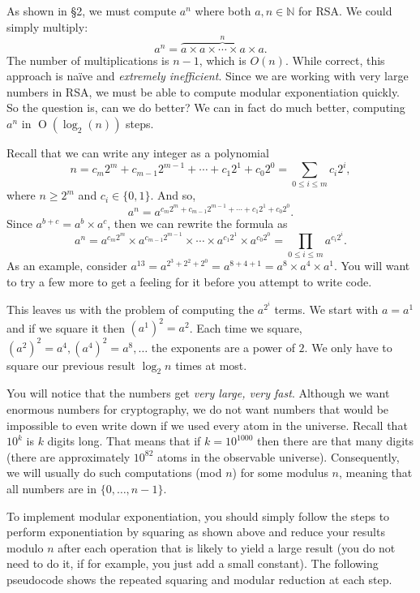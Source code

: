 As shown in \S2, we must compute $a^n$ where both $a, n \in \mathbb{N}$
for RSA. We could simply multiply:
\[
  a^n = \overbrace{a \times a \times \cdots \times a \times a}^n .
\]
The number of multiplications is $n-1$,
which is ${O}(n)$. While correct, this approach is na{\"{i}}ve and
\emph{extremely inefficient}. Since we are working with very large
numbers in RSA, we must be able to compute modular exponentiation
quickly. So the question is, can we do better? We can in fact do much
better, computing $a^n$ in $\operatorname{O}(\log_2(n))$ steps.

Recall that we can write any integer as a polynomial
\[
  n = c_m 2^m + c_{m-1} 2^{m-1} + \cdots + c_1 2^1 + c_0 2^0 =
  \sum_{0\le i \le m} c_i 2^i ,
\]
where $n \ge 2^m$ and $c_i \in \{0, 1\}$. And so,
\[
  a^n = a^{c_m 2^m + c_{m-1} 2^{m-1} + \cdots + c_1 2^1 + c_0 2^0} .
\]
Since $a^{b+c} = a^b \times a^c$, then we can rewrite the formula as
\[
  a^n = a^{c_m 2^m} \times a^{c_{m-1} 2^{m-1}} \times \cdots \times
  a^{c_1 2^1} \times a^{c_0 2^0} = \prod_{0\le i \le m} a^{c_i 2^i} .
\]
As an example, consider $a^{13} = a^{2^3 + 2^2 + 2^0} = a^{8 + 4 + 1} =
a^8 \times a^4 \times a^1$. You will want to try a few more to get a
feeling for it before you attempt to write code.

This leaves us with the problem of computing the $a^{2^i}$ terms. We
start with $a = a^1$ and if we square it then $(a^1)^2 = a^2$. Each
time we square, $(a^2)^2 = a^4, (a^4)^2 = a^8, \ldots$ the exponents
are a power of $2$. We only have to square our previous result $\log_2
n$ times at most.

You will notice that the numbers get \emph{very large, very fast}.
Although we want enormous numbers for cryptography, we do not want
numbers that would be impossible to even write down if we used every
atom in the universe. Recall that $10^k$ is $k$ digits long. That
means that if $k=10^{1000}$ then there are that many digits (there are
approximately $10^{82}$ atoms in the observable universe).
Consequently, we will usually do such computations (mod ${n}$) for
some modulus $n$, meaning that all numbers are in $\{0, \ldots,
n-1\}$.

To implement modular exponentiation, you should simply follow the
steps to perform exponentiation by squaring as shown above and
reduce your results modulo $n$ after each operation that is likely to
yield a large result (you do not need to do it, if for example, you
just add a small constant). The following pseudocode shows the
repeated squaring and modular reduction at each step.

